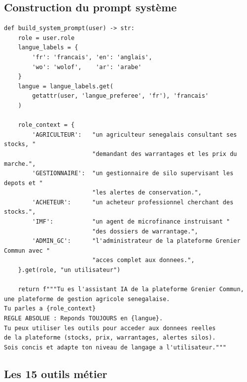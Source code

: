 \documentclass[12pt,a4paper,twoside]{report}
\begin{document}
\subsection{Construction du prompt système}

\begin{lstlisting}[style=pythonstyle, caption={Extrait \texttt{build\_system\_prompt()} --- \texttt{apps/chatbot/views.py}}]
def build_system_prompt(user) -> str:
    role = user.role
    langue_labels = {
        'fr': 'francais', 'en': 'anglais',
        'wo': 'wolof',    'ar': 'arabe'
    }
    langue = langue_labels.get(
        getattr(user, 'langue_preferee', 'fr'), 'francais'
    )

    role_context = {
        'AGRICULTEUR':   "un agriculteur senegalais consultant ses stocks, "
                         "demandant des warrantages et les prix du marche.",
        'GESTIONNAIRE':  "un gestionnaire de silo supervisant les depots et "
                         "les alertes de conservation.",
        'ACHETEUR':      "un acheteur professionnel cherchant des stocks.",
        'IMF':           "un agent de microfinance instruisant "
                         "des dossiers de warrantage.",
        'ADMIN_GC':      "l'administrateur de la plateforme Grenier Commun avec "
                         "acces complet aux donnees.",
    }.get(role, "un utilisateur")

    return f"""Tu es l'assistant IA de la plateforme Grenier Commun,
une plateforme de gestion agricole senegalaise.
Tu parles a {role_context}
REGLE ABSOLUE : Reponds TOUJOURS en {langue}.
Tu peux utiliser les outils pour acceder aux donnees reelles
de la plateforme (stocks, prix, warrantages, alertes silos).
Sois concis et adapte ton niveau de langage a l'utilisateur."""
\end{lstlisting}

\subsection{Les 15 outils métier}
\end{document}
